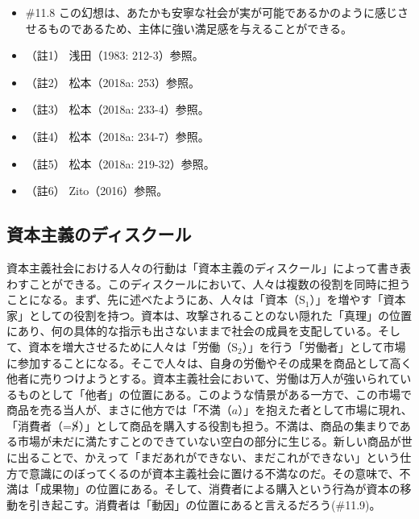 \begin{note}{}
  \begin{itemize}
    \tightlist
    \item{\#11.8}
      この幻想は、あたかも安寧な社会が実が可能であるかのように感じさせるものであるため、主体に強い満足感を与えることができる。
  \end{itemize}
\end{note}

\begin{itemize}
\tightlist
\item
  （註1） 浅田（1983: 212-3）\cite{Asada}参照。
\item
  （註2） 松本（2018a: 253）\cite{Matsumoto1}参照。
\item
  （註3） 松本（2018a: 233-4）\cite{Matsumoto1}参照。
\item
  （註4） 松本（2018a: 234-7）\cite{Matsumoto1}参照。
\item
  （註5） 松本（2018a: 219-32）\cite{Matsumoto1}参照。
\item
  （註6） Zito（2016）\cite{Zito}参照。
\end{itemize}

\subsection{資本主義のディスクール}\label{ux8cc7ux672cux4e3bux7fa9ux306eux30c7ux30a3ux30b9ux30afux30fcux30eb}

資本主義社会における人々の行動は「資本主義のディスクール」によって書き表わすことができる。このディスクールにおいて、人々は複数の役割を同時に担うことになる。まず、先に述べたようにあ、人々は「資本（\(\textrm{S}_1\)）」を増やす「資本家」としての役割を持つ。資本は、攻撃されることのない隠れた「真理」の位置にあり、何の具体的な指示も出さないままで社会の成員を支配している。そして、資本を増大させるために人々は「労働（\(\textrm{S}_2\)）」を行う「労働者」として市場に参加することになる。そこで人々は、自身の労働やその成果を商品として高く他者に売りつけようとする。資本主義社会において、労働は万人が強いられているものとして「他者」の位置にある。このような情景がある一方で、この市場で商品を売る当人が、まさに他方では「不満（\(a\)）」を抱えた者として市場に現れ、「消費者（=\(\cancel{\textrm{S}}\)）」として商品を購入する役割も担う。不満は、商品の集まりである市場が未だに満たすことのできていない空白の部分に生じる。新しい商品が世に出ることで、かえって「まだあれができない、まだこれができない」という仕方で意識にのぼってくるのが資本主義社会に置ける不満なのだ。その意味で、不満は「成果物」の位置にある。そして、消費者による購入という行為が資本の移動を引き起こす。消費者は「動因」の位置にあると言えるだろう(\#11.9)。

